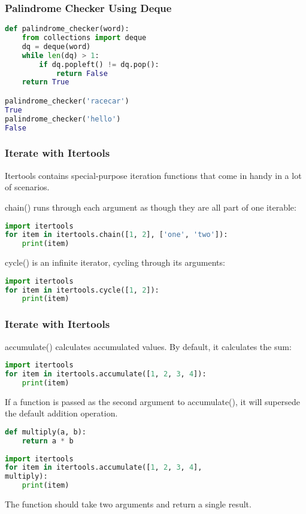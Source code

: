 \documentclass{beamer}
\begin{document}
\begin{frame}[fragile]
\frametitle{Palindrome Checker Using Deque}
\begin{lstlisting}[language=Python]
def palindrome_checker(word):
    from collections import deque
    dq = deque(word)
    while len(dq) > 1:
        if dq.popleft() != dq.pop():
            return False
    return True

palindrome_checker('racecar')
True
palindrome_checker('hello')
False
\end{lstlisting}
\end{frame}

\begin{frame}[fragile]
\frametitle{Iterate with Itertools}
Itertools contains special-purpose iteration functions that come in handy in a lot of scenarios.

chain() runs through each argument as though they are all part of one iterable:

\begin{lstlisting}[language=Python]
import itertools
for item in itertools.chain([1, 2], ['one', 'two']):
	print(item)
\end{lstlisting}

cycle() is an infinite iterator, cycling through its arguments:
\begin{lstlisting}[language=Python]
import itertools
for item in itertools.cycle([1, 2]):
    print(item)
\end{lstlisting}

\end{frame}


\begin{frame}[fragile]
\frametitle{Iterate with Itertools}

accumulate() calculates accumulated values. By default, it calculates the sum:

\begin{lstlisting}[language=Python]
import itertools
for item in itertools.accumulate([1, 2, 3, 4]):
    print(item)
\end{lstlisting}

If a function is passed as the second argument to accumulate(), it will supersede the default addition operation.
\begin{lstlisting}[language=Python]
def multiply(a, b):
    return a * b
    
import itertools
for item in itertools.accumulate([1, 2, 3, 4],
multiply):
    print(item)
\end{lstlisting}
The function should take two arguments and return a single result.
\end{frame}
\end{document}
